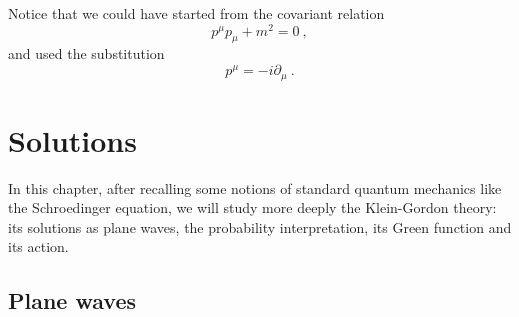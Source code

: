     Notice that we could have started from the covariant relation 
    \begin{equation*}
        p^\mu p_\mu + m^2 = 0 ~,
    \end{equation*}
    and used the substitution
    \begin{equation*}
         p^\mu = - i \partial_\mu ~.
    \end{equation*}

\chapter{Solutions}

    In this chapter, after recalling some notions of standard quantum mechanics like the Schroedinger equation, we will study more deeply the Klein-Gordon theory: its solutions as plane waves, the probability interpretation, its Green function and its action.

\section{Plane waves}

